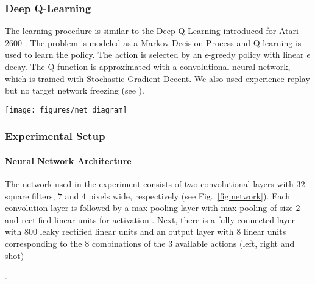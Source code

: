 \documentclass[english,american,conference, balance]{IEEEtran}
\begin{document}
\subsubsection{Deep Q-Learning\label{subsec:Deep-Q-Learning}}

The learning procedure is similar to the Deep Q-Learning introduced
for Atari 2600 \cite{mnih-dqn-2015}. The problem is modeled as a
Markov Decision Process and Q-learning \cite{watkins:mlj92} is used
to learn the policy. The action is selected by an $\epsilon$-greedy
policy with linear $\epsilon$ decay. The Q-function is approximated
with a convolutional neural network, which is trained with Stochastic
Gradient Decent. We also used experience replay but no target network
freezing (see \cite{mnih-dqn-2015}). 

\begin{figure*}
\texttt{[image: figures/net\_diagram]} \caption{\label{fig:network}Architecture of the convolutional neural network
used for the experiment.}
\end{figure*}


\subsubsection{Experimental Setup}

\paragraph{Neural Network Architecture}

The network used in the experiment consists of two convolutional layers
with $32$ square filters, $7$ and $4$ pixels wide, respectively
(see Fig.~\ref{fig:network}). Each convolution layer is followed
by a max-pooling layer with max pooling of size $2$ and rectified
linear units for activation \cite{AISTATS2011_GlorotBB11}. Next,
there is a fully-connected layer with $800$ leaky rectified linear
units \cite{Maas2013} and an output layer with $8$ linear units
corresponding to the $8$ combinations of the $3$ available actions
(left, right and shot)\begin{comment}
Zastanawiajace jest to dlaczego w\l a\'{s}ciwie 8, skoro 3 by wystarczy\l y
- tak wiem Mnih tez tak robil// Nie do ko\'{n}ca 3 wystarcz\k{a} bo
mo\.{z}na i\'{s}\'{c} i strzela\'{c} wi\k{e}c w tym przypadku dopiero
7 jest wyczerpuj\k{a}ce. 8 jest bli\.{z}sze temu jak cz\l owiek gra
- wciskaj\k{a}c przyciski. W miedzyczasie robi\l em z 3 bo mniej akcji
mimo wszystko. To kwestia interpretacji wyjsc. Skoro mamy 8 kombinacji
akcji to 3 binarne wyjscia wystarczaja zeby je obsluzyc. /nie wiem
jak mo\.{z}na u\.{z}y\'{c} wyj\'{s}\'{c} binarnych je\'{s}li outputem
sieci jest Q. Ma Pan racje. Ale to ciekawe pytanie (badawcze), prawda?
Bo jesli mam 30 mozliwych akcji (vide octopus), to 2{*}30 przestaje
byc wesole.
\end{comment}
.
\end{document}
